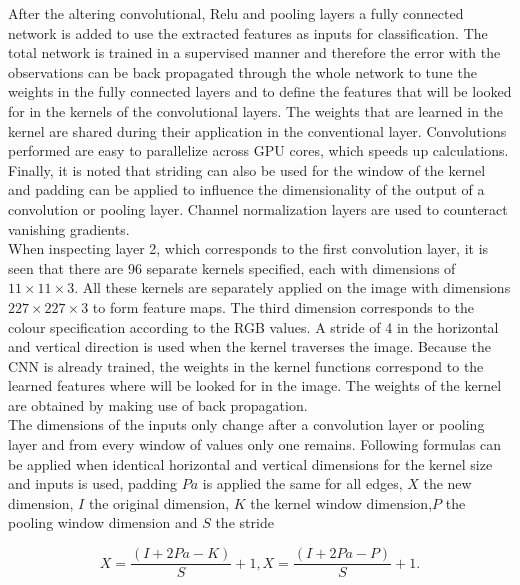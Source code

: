 \documentclass[a4paper,10pt]{article}
\begin{document}
After the altering convolutional, Relu and pooling layers a fully connected network is added to use the extracted features as inputs for classification. The total network is trained in a supervised manner and therefore the error with the observations can be back propagated through the whole network to tune the weights in the fully connected layers and to define the features that will be looked for in the kernels of the convolutional layers. The weights that are learned in the kernel are shared during their application in the conventional layer. Convolutions performed are easy to parallelize across GPU cores, which speeds up calculations. Finally, it is noted that striding can also be used for the window of the kernel and padding can be applied to influence the dimensionality of the output of a convolution or pooling layer. Channel normalization layers are used to counteract vanishing gradients.\\
When inspecting layer 2, which corresponds to the first convolution layer, it is seen that there are 96 separate kernels specified, each with dimensions of $ 11 \times 11 \times 3 $. All these kernels are separately applied on the image with dimensions $ 227 \times 227 \times 3 $ to form feature maps. The third dimension corresponds to the colour specification according to the RGB values. A stride of 4 in the horizontal and vertical direction is used when the kernel traverses the image. Because the CNN is already trained, the weights in the kernel functions correspond to the learned features where will be looked for in the image. The weights of the kernel are obtained by making use of back propagation.\\
The dimensions of the inputs only change after a convolution layer or pooling layer and from every window of values only one remains. Following formulas can be applied when identical horizontal and vertical dimensions for the kernel size and inputs is used, padding $ Pa $ is applied the same for all edges, $ X $ the new dimension, $ I $ the original dimension, $ K $ the kernel window dimension,$  P $ the pooling window dimension and $ S $ the stride 

\begin{subequations}
	\begin{equation}
		X = \frac{(I + 2Pa -K)}{S} + 1,
	\end{equation} 
	\begin{equation}
			X = \frac{(I+2Pa-P)}{S} + 1.
	\end{equation}   
\end{subequations}
\end{document}
